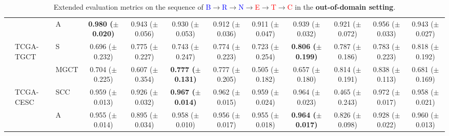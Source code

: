 \documentclass[10pt,twocolumn,letterpaper]{article}
\begin{document}
\begin{table}[!ht]
{{\begin{tabular}{lllcc|ccccc|cc}
                &                  & A                   & \textbf{0.980 ($\pm$0.020)}  & 0.943 ($\pm$0.056)           & 0.930 ($\pm$0.053)          & 0.912 ($\pm$0.036)          & 0.911 ($\pm$0.047)          & 0.939 ($\pm$0.032)          & 0.921 ($\pm$0.072)          & 0.956 ($\pm$0.033)  & 0.943 ($\pm$0.027)    \\
                & TCGA-TGCT        & S & 0.696 ($\pm$0.232)           & 0.775 ($\pm$0.227)           & 0.743 ($\pm$0.247)          & 0.774 ($\pm$0.223)          & 0.723 ($\pm$0.254)          & \textbf{0.806 ($\pm$0.199)} & 0.787 ($\pm$0.186)          & 0.783 ($\pm$0.223)  & 0.818 ($\pm$0.192)    \\
                &                  & MGCT            & 0.704 ($\pm$0.225)           & 0.607 ($\pm$0.354)           & \textbf{0.777 ($\pm$0.131)} & 0.777 ($\pm$0.205)          & 0.505 ($\pm$0.182)          & 0.657 ($\pm$0.180)          & 0.814 ($\pm$0.191)          & 0.838 ($\pm$0.113)  & 0.681 ($\pm$0.169)    \\
                & TCGA-CESC        & SCC          & 0.959 ($\pm$0.013)           & 0.926 ($\pm$0.032)           & \textbf{0.967 ($\pm$0.014)} & 0.962 ($\pm$0.015)          & 0.959 ($\pm$0.024)          & 0.964 ($\pm$0.023)          & 0.465 ($\pm$0.243)          & 0.972 ($\pm$0.017)  & 0.958 ($\pm$0.021)    \\
                &                  & A                   & 0.955 ($\pm$0.014)           & 0.895 ($\pm$0.034)           & 0.958 ($\pm$0.010)          & 0.956 ($\pm$0.017)          & 0.955 ($\pm$0.018)          & \textbf{0.964 ($\pm$0.017)} & 0.826 ($\pm$0.098)          & 0.928 ($\pm$0.022)  & 0.960 ($\pm$0.013)   \\ \bottomrule
\end{tabular}}}
\caption{{Extended evaluation metrics on the sequence of \textcolor{blue}{B}$\rightarrow$\textcolor{blue}{R}$\rightarrow$\textcolor{blue}{N}$\rightarrow$\textcolor{red}{E}$\rightarrow$\textcolor{red}{T}$\rightarrow$\textcolor{red}{C} in the \textbf{out-of-domain setting}.}}
\label{tab:extended2}
\end{table}
\end{document}
